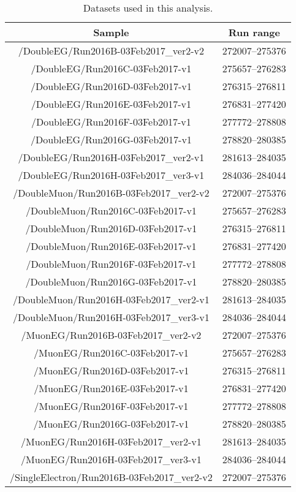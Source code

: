 \begin{table}
\begin{center}
\small
\caption{Datasets used in this analysis.}
\label{tab:datasets}
 \begin{tabular}{| c |c|}
  \hline 
Sample & Run range\\\hline
/DoubleEG/Run2016B-03Feb2017\_ver2-v2 & 272007--275376\\
/DoubleEG/Run2016C-03Feb2017-v1 & 275657--276283\\
/DoubleEG/Run2016D-03Feb2017-v1 & 276315--276811\\
/DoubleEG/Run2016E-03Feb2017-v1 & 276831--277420\\
/DoubleEG/Run2016F-03Feb2017-v1 & 277772--278808\\
/DoubleEG/Run2016G-03Feb2017-v1 & 278820--280385\\
/DoubleEG/Run2016H-03Feb2017\_ver2-v1 & 281613--284035\\
/DoubleEG/Run2016H-03Feb2017\_ver3-v1 & 284036--284044\\\hline
/DoubleMuon/Run2016B-03Feb2017\_ver2-v2 & 272007--275376\\
/DoubleMuon/Run2016C-03Feb2017-v1 & 275657--276283\\
/DoubleMuon/Run2016D-03Feb2017-v1 & 276315--276811\\
/DoubleMuon/Run2016E-03Feb2017-v1 & 276831--277420\\
/DoubleMuon/Run2016F-03Feb2017-v1 & 277772--278808\\
/DoubleMuon/Run2016G-03Feb2017-v1 & 278820--280385\\
/DoubleMuon/Run2016H-03Feb2017\_ver2-v1 & 281613--284035\\
/DoubleMuon/Run2016H-03Feb2017\_ver3-v1 & 284036--284044\\\hline
/MuonEG/Run2016B-03Feb2017\_ver2-v2 & 272007--275376\\
/MuonEG/Run2016C-03Feb2017-v1  & 275657--276283\\
/MuonEG/Run2016D-03Feb2017-v1 & 276315--276811\\
/MuonEG/Run2016E-03Feb2017-v1 & 276831--277420\\
/MuonEG/Run2016F-03Feb2017-v1 & 277772--278808\\
/MuonEG/Run2016G-03Feb2017-v1 & 278820--280385\\
/MuonEG/Run2016H-03Feb2017\_ver2-v1 & 281613--284035\\
/MuonEG/Run2016H-03Feb2017\_ver3-v1 & 284036--284044\\\hline
/SingleElectron/Run2016B-03Feb2017\_ver2-v2 & 272007--275376\\

\end{tabular}
\end{center}
\end{table}
